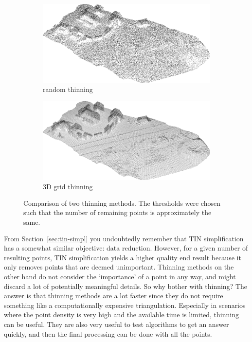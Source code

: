 \begin{figure}
  \centering
  \begin{subfigure}[b]{0.95\linewidth}
    \centering
    \includegraphics[width=\textwidth]{rand01.png}
    \caption{random thinning}
  \end{subfigure}

  \begin{subfigure}[b]{0.95\linewidth}
    \centering
    \includegraphics[width=\textwidth]{voxel08m.png}
    \caption{3D grid thinning}
  \end{subfigure}
\caption{Comparison of two thinning methods. The thresholds were chosen such that the number of remaining points is approximately the same.}%
\label{fig:randvsgrid}
\end{figure}

From Section~\ref{sec:tin-simpl} you undoubtedly remember that TIN simplification has a somewhat similar objective: data reduction. 
However, for a given number of resulting points, TIN simplification yields a higher quality end result because it only removes points that are deemed unimportant.
Thinning methods on the other hand do not consider the `importance' of a point in any way, and might discard a lot of potentially meaningful details.
So why bother with thinning? The answer is that thinning methods are a lot faster since they do not require something like a computationally expensive triangulation.
Especially in scenarios where the point density is very high and the available time is limited, thinning can be useful.
They are also very useful to test algorithms to get an answer quickly, and then the final processing can be done with all the points.


